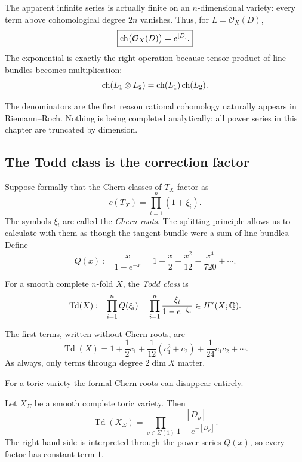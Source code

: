 The apparent infinite series is actually finite on an
\(n\)-dimensional variety: every term above cohomological degree
\(2n\) vanishes. Thus, for \(L=\mathcal O_X(D)\),
\[
\boxed{
\operatorname{ch}\bigl(\mathcal O_X(D)\bigr)=e^{[D]}.
}
\]
The exponential is exactly the right operation because tensor product
of line bundles becomes multiplication:
\[
\operatorname{ch}(L_1\otimes L_2)
=
\operatorname{ch}(L_1)\operatorname{ch}(L_2).
\]

\begin{remark}
The denominators are the first reason rational cohomology naturally
appears in Riemann--Roch. Nothing is being completed analytically:
all power series in this chapter are truncated by dimension.
\end{remark}

\subsection{The Todd class is the correction factor}

Suppose formally that the Chern classes of \(T_X\) factor as
\[
c(T_X)=\prod_{i=1}^n(1+\xi_i).
\]
The symbols \(\xi_i\) are called the \emph{Chern roots}. The splitting
principle allows us to calculate with them as though the tangent bundle
were a sum of line bundles. Define
\[
Q(x)
:=
\frac{x}{1-e^{-x}}
=
1+\frac{x}{2}+\frac{x^2}{12}
-\frac{x^4}{720}+\cdots.
\]

\begin{definition}
\label{def:todd-class}
For a smooth complete \(n\)-fold \(X\), the \emph{Todd class} is
\[
\operatorname{Td}(X)
:=
\prod_{i=1}^n Q(\xi_i)
=
\prod_{i=1}^n
\frac{\xi_i}{1-e^{-\xi_i}}
\in H^*(X;\mathbb{Q}).
\]
\end{definition}

The first terms, written without Chern roots, are
\[
\operatorname{Td}(X)
=
1+\frac12c_1
+\frac1{12}(c_1^2+c_2)
+\frac1{24}c_1c_2+\cdots.
\]
As always, only terms through degree \(2\dim X\) matter.

For a toric variety the formal Chern roots can disappear entirely.

\begin{theorem}
\label{thm:toric-todd-class}
Let \(X_\Sigma\) be a smooth complete toric variety. Then
\[
\boxed{
\operatorname{Td}(X_\Sigma)
=
\prod_{\rho\in\Sigma(1)}
\frac{[D_\rho]}{1-e^{-[D_\rho]}}.
}
\]
The right-hand side is interpreted through the power series
\(Q(x)\), so every factor has constant term \(1\).
\end{theorem}

